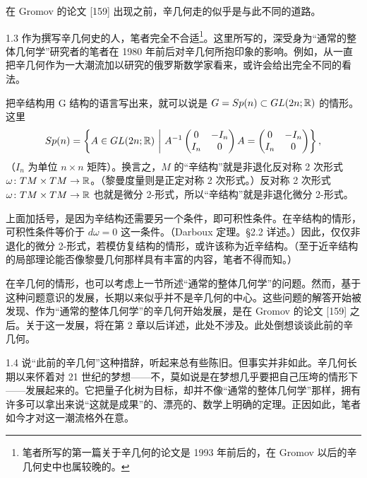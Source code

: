 在 Gromov 的论文 [159] 出现之前，辛几何走的似乎是与此不同的道路。

\begin{remark}{1.3}
  作为撰写辛几何史的人，笔者完全不合适\footnote{笔者所写的第一篇关于辛几何的论文是 1993 年前后的，在 Gromov 以后的辛几何史中也属较晚的。}。这里所写的，深受身为“通常的整体几何学”研究者的笔者在 1980 年前后对辛几何所抱印象的影响。例如，从一直把辛几何作为一大潮流加以研究的俄罗斯数学家看来，或许会给出完全不同的看法。
\end{remark}

把辛结构用 G 结构的语言写出来，就可以说是 $G=Sp(n)\subset GL(2n;\mathbb{R})$ 的情形。这里
\[
  Sp(n)=\left\{A\in GL(2n;\mathbb{R})\ \middle|\
  A^{-1}\begin{pmatrix}0&-I_n\\ I_n&0\end{pmatrix}A
  =\begin{pmatrix}0&-I_n\\ I_n&0\end{pmatrix}\right\},
\]
（$I_n$ 为单位 $n\times n$ 矩阵）。换言之，$M$ 的“辛结构”就是非退化反对称 2 次形式 $\omega\colon TM\times TM\to\mathbb{R}$。（黎曼度量则是正定对称 2 次形式。）反对称 2 次形式 $\omega\colon TM\times TM\to\mathbb{R}$ 也就是微分 2-形式，所以“辛结构”就是非退化微分 2-形式。

上面加括号，是因为辛结构还需要另一个条件，即可积性条件。在辛结构的情形，可积性条件等价于 $d\omega=0$ 这一条件。（Darboux 定理。§2.2 详述。）因此，仅仅非退化的微分 2-形式，若模仿复结构的情形，或许该称为近辛结构。（至于近辛结构的局部理论能否像黎曼几何那样具有丰富的内容，笔者不得而知。）

在辛几何的情形，也可以考虑上一节所述“通常的整体几何学”的问题。然而，基于这种问题意识的发展，长期以来似乎并不是辛几何的中心。这些问题的解答开始被发现、作为“通常的整体几何学”的辛几何开始发展，是在 Gromov 的论文 [159] 之后。关于这一发展，将在第 2 章以后详述，此处不涉及。此处倒想谈谈此前的辛几何。

\begin{remark}{1.4}
  说“此前的辛几何”这种措辞，听起来总有些陈旧。但事实并非如此。辛几何长期以来怀着对 21 世纪的梦想——不，莫如说是在梦想几乎要把自己压垮的情形下——发展起来的。它把量子化树为目标，却并不像“通常的整体几何学”那样，拥有许多可以拿出来说“这就是成果”的、漂亮的、数学上明确的定理。正因如此，笔者如今才对这一潮流格外在意。
\end{remark}

